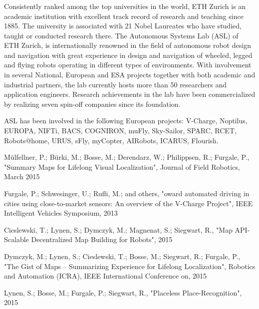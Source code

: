 \subsubsection{\ETHZ}


Consistently ranked among the top universities in the world, ETH Zurich is an academic institution with excellent track record of research and teaching since
1885. The university is associated with 21 Nobel Laureates who have studied, taught or conducted research there. The Autonomous Systems Lab (ASL) of ETH
Zurich, is internationally renowned in the field of autonomous robot design and navigation with great experience in design and navigation of wheeled, legged and flying robots operating in different types of environments. With involvement in several National, European and ESA projects together with both academic and industrial partners, the lab currently hosts more than 50 researchers and application engineers. Research achievements in the lab have been commercialized by realizing seven spin-off companies since its foundation.

ASL has been involved in the following European projects:  V-Charge, Noptilus, EUROPA, NIFTi, BACS, COGNIRON, muFly,
Sky-Sailor, SPARC, RCET, Robots@home, URUS, sFly, myCopter, AIRobots, ICARUS, Flourish.

\begin{keypubs}{\ETHZ}
	\item
	M{\"u}lfellner, P.; B{\"u}rki, M.; Bosse, M.; Derendarz, W.; Philippsen, R.; Furgale, P., "Summary Maps for Lifelong Visual Localization", Journal of Field Robotics, March 2015
	\item
	Furgale, P.; Schwesinger, U.; Rufli, M.; and others, "oward automated driving in cities using close-to-market sensors: An overview of the V-Charge Project", IEEE Intelligent Vehicles Symposium, 2013
	\item
	Cieslewski, T.; Lynen, S.; Dymczyk, M.; Magnenat, S.; Siegwart, R., "Map API-Scalable Decentralized Map Building for Robots", 2015
	\item
	Dymczyk, M.; Lynen, S.; Cieslewski, T.; Bosse, M.; Siegwart, R.; Furgale, P., "The Gist of Maps -- Summarizing Experience for Lifelong Localization", Robotics and Automation (ICRA), IEEE International Conference on, 2015
	\item
	Lynen, S.; Bosse, M.; Furgale, P.; Siegwart, R., "Placeless Place-Recognition", 2015
	\end{keypubs}

